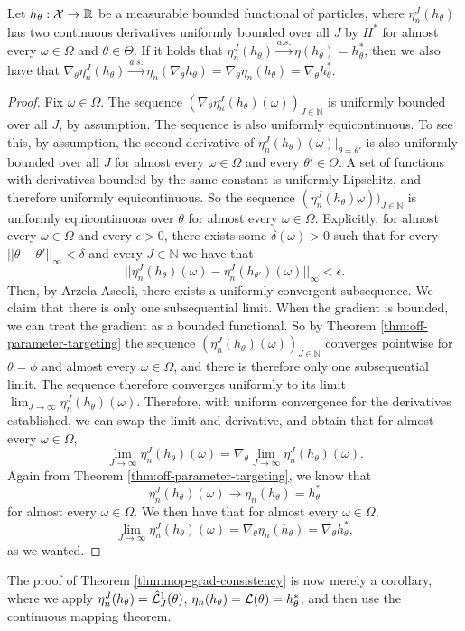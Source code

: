 \begin{thm}
    Let $h_\theta : {\mathcal{X}} \to \mathbb{R}$ be a measurable bounded functional of particles, where $\eta_n^J(h_\theta)$ has two continuous derivatives uniformly bounded over all $J$ by $H^*$ for almost every $\omega\in\Omega$ and $\theta \in \Theta$. If it holds that $\eta_n^J(h_\theta) \stackrel{a.s.}{\to} \eta(h_\theta) = h^*_\theta$, then we also have that $\nabla_\theta \eta_n^J(h_\theta)  \stackrel{a.s.}{\to} \eta_n(\nabla_\theta h_\theta) = \nabla_\theta \eta_n(h_\theta) = \nabla_\theta h^*_\theta$. 
\end{thm}
\begin{proof}
    Fix $\omega \in \Omega$. The sequence $(\nabla_\theta \eta_n^J(h_\theta)(\omega))_{J \in \mathbb{N}}$ is uniformly bounded over all $J$, by assumption. The sequence is also uniformly equicontinuous. To see this, by assumption, the second derivative of $\eta_n^J(h_\theta)(\omega)|_{\theta=\theta'}$ is also uniformly bounded over all $J$ for almost every $\omega\in \Omega$ and every $\theta' \in \Theta$. A set of functions with derivatives bounded by the same constant is uniformly Lipschitz, and therefore uniformly equicontinuous. So the sequence $(\eta_n^J(h_\theta)\omega))_{J \in \mathbb{N}}$ is uniformly equicontinuous over $\theta$ for almost every $\omega \in \Omega$. 
    Explicitly, for almost every $\omega \in \Omega$ and every $\epsilon>0$, there exists some $\delta(\omega)>0$ such that for every $||\theta - \theta'||_{\infty}<\delta$ and every $J \in \mathbb{N}$ we have that
    $$||\eta_n^J(h_\theta)(\omega)-\eta_n^J(h_{\theta'})(\omega)||_\infty < \epsilon.$$
    Then, by Arzela-Ascoli, there exists a uniformly convergent subsequence. We claim that there is only one subsequential limit. When the gradient is bounded, we can treat the gradient as a bounded functional. So by Theorem \ref{thm:off-parameter-targeting} the sequence $(\eta_n^J(h_\theta)(\omega))_{J \in \mathbb{N}}$ converges pointwise for $\theta=\phi$ and almost every $\omega \in \Omega$, and there is therefore only one subsequential limit. The sequence therefore converges uniformly to its limit $\lim_{J \to \infty} \eta_n^J(h_\theta)(\omega).$ Therefore, with uniform convergence for the derivatives established, we can swap the limit and derivative, and obtain that for almost every $\omega \in \Omega$, 
    $$\lim_{J \to \infty} \eta_n^J(h_\theta)(\omega) = \nabla_\theta \lim_{J \to \infty} \eta_n^J(h_\theta)(\omega).$$
Again from Theorem \ref{thm:off-parameter-targeting}, we know that
    $$\eta_n^J(h_\theta)(\omega) \to \eta_n(h_\theta) = h^*_\theta$$ for almost every $\omega\in\Omega$.
    We then have that for almost every $\omega \in \Omega$, 
    $$\lim_{J \to \infty} \eta_n^J(h_\theta)(\omega) = \nabla_\theta \eta_n(h_\theta) = \nabla_\theta h^*_\theta,$$
    as we wanted. 
    \end{proof}
The proof of Theorem \ref{thm:mop-grad-consistency} is now merely a corollary, where we apply $\eta_n^J (h_\theta) = \hat{\mathcal{L}}^1_J(\theta)$, $\eta_n(h_\theta) = \mathcal{L}(\theta) = h_\theta^*$, and then use the continuous mapping theorem. 



